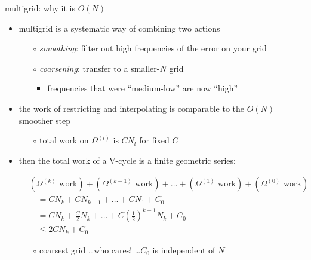 \documentclass[hide notes,intlimits,usenames,dvipsnames]{beamer}
\begin{document}
\begin{frame}{multigrid: why it is $O(N)$}

\begin{itemize}
\item multigrid is a systematic way of combining two actions
	\begin{itemize}
	\item[$\circ$] \emph{smoothing}: filter out high frequencies of the error on your grid
	\item[$\circ$] \emph{coarsening}: transfer to a smaller-$N$ grid
    	\begin{itemize}
	    \item frequencies that were ``medium-low'' are now ``high''
    	\end{itemize}
	\end{itemize}
\item the work of restricting and interpolating is comparable to the $O(N)$ smoother step
	\begin{itemize}
	\item[$\circ$] total work on $\Omega^{(l)}$ is $C N_l$ for fixed $C$
	\end{itemize}
\item then the total work of a V-cycle is a finite geometric series:

\vspace{-3mm}
\small
\begin{align*}
&(\Omega^{(k)} \text{ work}) + (\Omega^{(k-1)} \text{ work}) + \dots + (\Omega^{(1)} \text{ work}) + (\Omega^{(0)} \text{ work}) \\
&\quad = C N_k + C N_{k-1} + \dots + C N_1 + C_0 \\
&\quad = C N_k + \frac{C}{2} N_k + \dots + C \left(\frac{1}{2}\right)^{k-1} N_k + C_0 \\
&\quad \le 2 C N_k + C_0
\end{align*}

    \vspace{-2mm}
	\begin{itemize}
	\item[$\circ$] coarsest grid \dots who cares! \dots $C_0$ is independent of $N$
	\end{itemize}

\end{itemize}
\end{frame}
\end{document}

